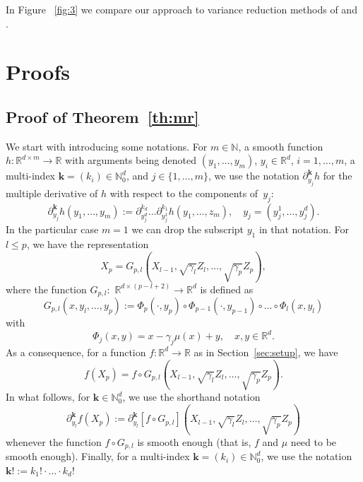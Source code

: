\documentclass[preprint]{imsart}
\begin{document}
In Figure ~\ref{fig:3} we compare our approach to variance reduction methods of \cite{mira2013zero} and \cite{brosse2018diffusion}.

\section{Proofs}
\label{sec:proofs}
\subsection{Proof of Theorem~\ref{th:mr}}
We start with introducing some notations.
For $m\in\mathbb N$, a smooth function
$h\colon\mathbb R^{d\times m}\to\mathbb R$
with arguments being denoted
$(y_1,\ldots,y_m)$, $y_i\in\mathbb R^d$, $i=1,\ldots,m$,
a multi-index $\mathbf k=(k_i)\in\mathbb N_0^d$,
and $j\in\{1,\ldots,m\}$,
we use the notation $\partial^{\mathbf k}_{y_j} h$ for the multiple derivative of $h$
with respect to the components of~$y_j$:
$$
\partial^{\mathbf k}_{y_j} h(y_1,\ldots,y_m)
:=\partial^{k_d}_{y_j^d}
\ldots
\partial^{k_1}_{y_j^1}
h(y_1,\ldots,z_m),
\quad y_j=(y_j^1,\ldots,y_j^d).
$$
In the particular case $m=1$ we can drop
the subscript $y_1$ in that notation.
For $l\le p$, we have the representation
\[
X_{p}=G_{p,l}(X_{l-1},\sqrt{\gamma_{l}}Z_{l},\ldots,\sqrt{\gamma_{p}}Z_{p}),
\]
where the function \(G_{p,l}:\) \(\mathbb{R}^{d\times(p-l+2)}\to \mathbb{R}^{d}\) is defined as
\begin{equation}
\label{eq:definition-G-p-l}
G_{p,l}(x,y_l,\ldots,y_p):=\Phi_{p}(\cdot,y_{p})\circ\Phi_{p-1}(\cdot,y_{p-1})\circ\ldots\circ\Phi_{l}(x,y_{l})
\end{equation}
with
\[
\Phi_{j}(x,y)=x-\gamma_{j}\mu(x)+y,
\quad x,y\in\mathbb R^d.
\]
As a consequence,
for a function $f\colon\mathbb R^d\to\mathbb R$
as in Section~\ref{sec:setup}, we have
$$
f\left(X_{p}\right) =f\circ G_{p,l}(X_{l-1},\sqrt{\gamma_{l}}Z_{l},\ldots,\sqrt{\gamma_{p}}Z_{p}).
$$
In what follows, for $\mathbf{k}\in\mathbb N_0^d$,
we use the shorthand notation
\begin{equation}
\label{eq:definition-differential-f-p}
\partial_{y_l}^{\mathbf k} f\left(X_{p}\right)
:=\partial_{y_l}^{\mathbf k} [f\circ G_{p,l}](X_{l-1},\sqrt{\gamma_{l}}Z_{l},\ldots,\sqrt{\gamma_{p}}Z_{p})
\end{equation}
whenever the function $f\circ G_{p,l}$ is smooth enough
(that is, $f$ and $\mu$ need to be smooth enough).
Finally, for a multi-index $\mathbf{k}=(k_i)\in\mathbb N_0^d$, we use the notation
\(\mathbf{k} ! :=k_1!\cdot\ldots\cdot k_d !\)
\end{document}
